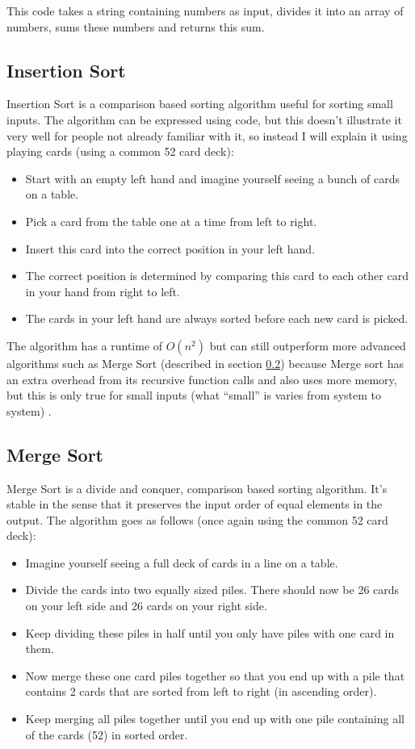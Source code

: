 This code takes a string containing numbers as input, divides it into an array of numbers, sums these numbers and returns this sum.

\subsection{Insertion Sort}
Insertion Sort is a comparison based sorting algorithm useful for sorting small inputs. The algorithm can be expressed using code, but this doesn't illustrate it very well for people not already familiar with it, so instead I will explain it using playing cards (using a common 52 card deck):

\begin{itemize}
\item Start with an empty left hand and imagine yourself seeing a bunch of cards on a table.
\item Pick a card from the table one at a time from left to right.
\item Insert this card into the correct position in your left hand.
\item The correct position is determined by comparing this card to each other card in your hand from right to left.
\item The cards in your left hand are always sorted before each new card is picked.
\end{itemize} 

The algorithm has a runtime of $O(n^2)$ but can still outperform more advanced algorithms such as Merge Sort (described in section \ref{subsec:merge_sort}) because Merge sort has an extra overhead from its recursive function calls and also uses more memory, but this is only true for small inputs (what ``small'' is varies from system to system) \cite{Insertionsort}.


\subsection{Merge Sort} \label{subsec:merge_sort}
Merge Sort is a divide and conquer, comparison based sorting algorithm. It's stable in the sense that it preserves the input order of equal elements in the output. The algorithm goes as follows (once again using the common 52 card deck):

\begin{itemize}
\item Imagine yourself seeing a full deck of cards in a line on a table.
\item Divide the cards into two equally sized piles. There should now be 26 cards on your left side and 26 cards on your right side.
\item Keep dividing these piles in half until you only have piles with one card in them. 
\item Now merge these one card piles together so that you end up with a pile that contains 2 cards that are sorted from left to right (in ascending order).
\item Keep merging all piles together until you end up with one pile containing all of the cards (52) in sorted order.

\end{itemize} 

